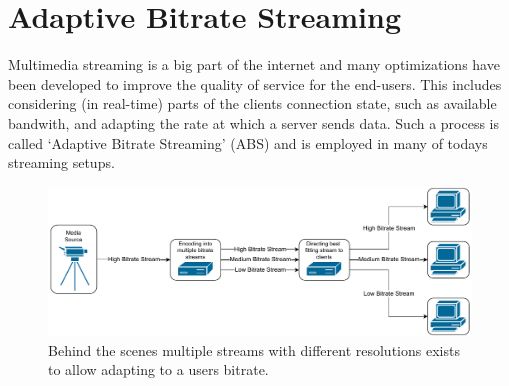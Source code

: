 \section{Adaptive Bitrate Streaming}\label{sec:adaptive_bitrate_streaming}
Multimedia streaming is a big part of the internet and many optimizations have
been developed to improve the quality of service for the end-users.
This includes considering (in real-time) parts of the clients connection state, 
such as available bandwith, and adapting the rate at which a server sends data.
Such a process is called `Adaptive Bitrate Streaming' (ABS) and is employed in many 
of todays streaming setups.

\begin{figure}[htbp] %
    \centering
    \includegraphics[width=\textwidth]{figures/02_background/adaptive-bitrate-streaming.drawio.pdf}
    \caption[Adaptive streaming schematic]{Behind the scenes multiple streams with different
    resolutions exists to allow adapting to a users bitrate.}\label{fig:adaptive-bitrate-streaming}
\end{figure}
\vspace{1cm}

